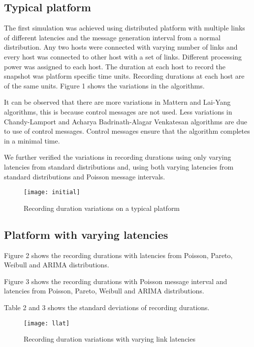\documentclass[12pt]{article}
\begin{document}
\subsection{Typical platform}

The first simulation was achieved using distributed platform with multiple links of different latencies and the message generation interval from a normal distribution. Any two hosts were connected with varying number of links and every host was connected to other host with a set of links. Different processing power was assigned to each host. The duration at each host to record the snapshot was platform specific time units. Recording durations at each host are of the same units.
Figure 1 shows the variations in the algorithms.

It can be observed that there are more variations in Mattern and Lai-Yang algorithms, this is because control messages are not used. Less variations in Chandy-Lamport and Acharya Badrinath-Alagar Venkatesan algorithms are due to use of control messages. Control messages ensure that the algorithm completes in a minimal time.

We further verified the variations in recording durations using only varying latencies from standard distributions and, using both varying latencies from standard distributions and Poisson message intervals.

\begin{figure}[!htb]
\centering
\texttt{[image: initial]}
\caption{Recording duration variations on a typical platform}
\vskip -6pt
\end{figure}
\subsection{Platform with varying latencies}

Figure 2 shows the recording durations with latencies from Poisson, Pareto, Weibull and ARIMA distributions.

Figure 3 shows the recording durations with Poisson message interval and latencies from Poisson, Pareto, Weibull and ARIMA distributions.

Table 2 and 3 shows the standard deviations of recording durations.

\begin{figure*}[!htb]
\centering
\texttt{[image: llat]}
\caption{Recording duration variations with varying link latencies}
\end{figure*}
\end{document}
